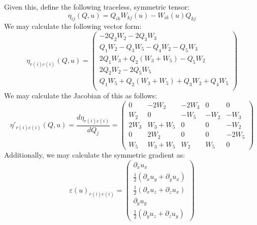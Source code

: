 \documentclass[reqno]{article}
\begin{document}
  Given this, define the following traceless, symmetric tensor:
  \begin{equation}
    \eta_{ij}(Q, u)
    =
    Q_{ik} W_{kj}(u) - W_{ik}(u) Q_{kj}
  \end{equation}
  We may calculate the following vector form:
  \begin{equation}
    \eta_{r(i) c(i)} (Q, u)
    =
    \left(
      \begin{matrix}
        - 2 Q_{2} W_{2} - 2 Q_{3} W_{3} \\
        Q_{1} W_{2} - Q_{3} W_{5} - Q_{4} W_{2} - Q_{5} W_{3} \\
        2 Q_{1} W_{3} + Q_{2} (W_3 + W_5) - Q_{5} W_{2} \\
        2 Q_{2} W_{2} - 2 Q_{5} W_{5} \\
        Q_1 W_5 + Q_{2} (W_{3} + W_5) + Q_{3} W_{2} + Q_{4} W_{5} \\
      \end{matrix}
    \right)
  \end{equation}
  We may calculate the Jacobian of this as follows:
  \begin{equation}
    \eta'_{r(i) c(i)} (Q, u)
    =
    \frac{d \eta_{r(i) c(i)}}{d Q_j}
    =
    \left(
      \begin{matrix}
        0 & - 2 W_{2} & - 2 W_{3} & 0 & 0\\
        W_{2} & 0 & - W_{5} & - W_{2} & - W_{3}\\
        2 W_{3} & W_{3} + W_{5} & 0 & 0 & - W_{2}\\
        0 & 2 W_{2} & 0 & 0 & - 2 W_{5}\\
        W_{5} & W_{3} + W_{5} & W_{2} & W_{5} & 0
      \end{matrix}
    \right)
  \end{equation}
  Additionally, we may calculate the symmetric gradient as:
  \begin{equation}
    \varepsilon(u)_{r(i) c(i)}
    =
    \begin{pmatrix}
      \partial_x u_x \\
      \tfrac12 \left( \partial_x u_y + \partial_y u_x \right) \\
      \tfrac12 \left( \partial_x u_z + \partial_z u_x \right) \\
      \partial_y u_y \\
      \tfrac12 \left( \partial_y u_z + \partial_z u_y \right)
    \end{pmatrix}
  \end{equation}
\end{document}
